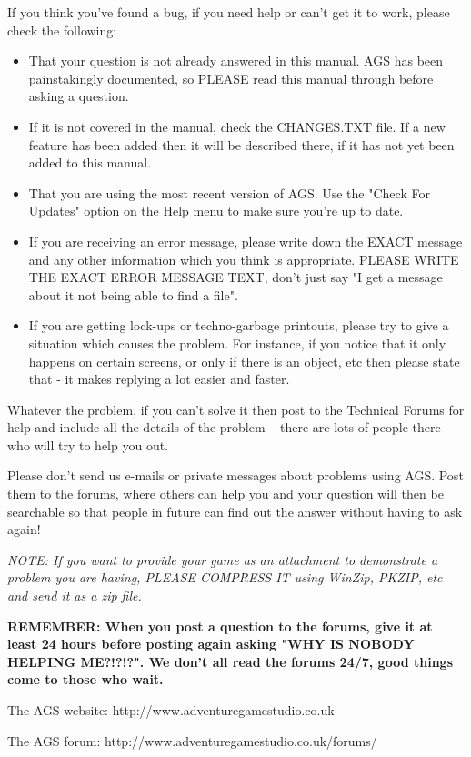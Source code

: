 If you think you've found a bug, if you need help or can't get it to work,
please check the following:\begin{itemize}
\item That your question is not already answered in this manual. AGS has been
painstakingly documented, so PLEASE read this manual through before asking a question.
\item If it is not covered in the manual, check the CHANGES.TXT file. If a new
feature has been added then it will be described there, if it has not yet
been added to this manual.
\item That you are using the most recent version of AGS. Use the "Check For
Updates" option on the Help menu to make sure you're up to date.
\item If you are receiving an error message, please write down the EXACT message
and any other information which you think is appropriate. PLEASE WRITE THE
EXACT ERROR MESSAGE TEXT, don't just say "I get a message about it not being
able to find a file".
\item If you are getting lock-ups or techno-garbage printouts, please try to
give a situation which causes the problem. For instance, if you notice that
it only happens on certain screens, or only if there is an object, etc then
please state that - it makes replying a lot easier and faster.
\end{itemize}
Whatever the problem, if you can't solve it then post to the Technical Forums
for help and include all the details of the problem -- there are lots of
people there who will try to help you out.

Please don't send us e-mails or private messages about problems using AGS.
Post them to the forums, where others can help you and your question will
then be searchable so that people in future can find out the answer without
having to ask again!

\it{NOTE:} If you want to provide your game as an attachment to demonstrate a problem you are
having, PLEASE COMPRESS IT using WinZip, PKZIP, etc and send it as a
zip file.

\bf{REMEMBER:} When you post a question to the forums, give it at least 24
hours before posting again asking "WHY IS NOBODY HELPING ME?!?!?". We don't
all read the forums 24/7, good things come to those who wait.

The AGS website: http://www.adventuregamestudio.co.uk

The AGS forum:   http://www.adventuregamestudio.co.uk/forums/


